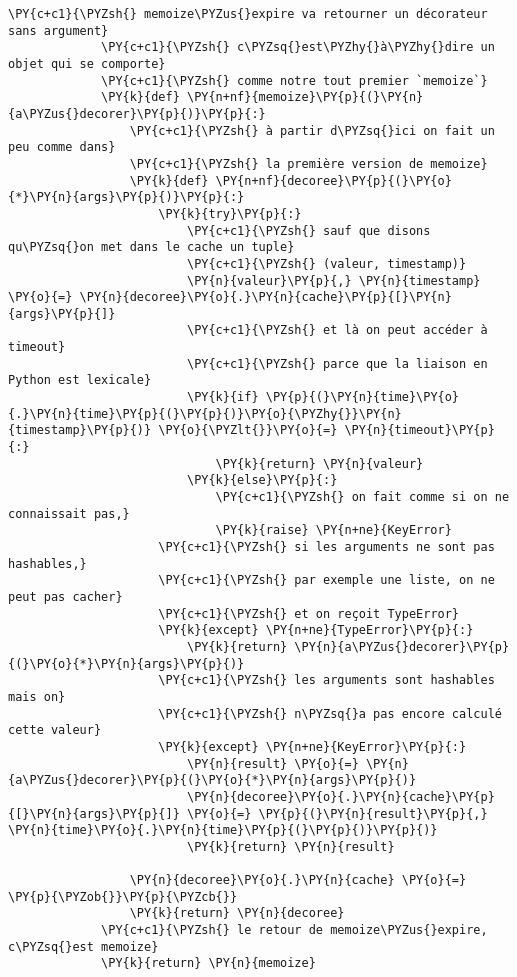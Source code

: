 \begin{Verbatim}[commandchars=\\\{\},frame=single,framerule=0.3mm,rulecolor=\color{cellframecolor}]
             \PY{c+c1}{\PYZsh{} memoize\PYZus{}expire va retourner un décorateur sans argument}
             \PY{c+c1}{\PYZsh{} c\PYZsq{}est\PYZhy{}à\PYZhy{}dire un objet qui se comporte}
             \PY{c+c1}{\PYZsh{} comme notre tout premier `memoize`}
             \PY{k}{def} \PY{n+nf}{memoize}\PY{p}{(}\PY{n}{a\PYZus{}decorer}\PY{p}{)}\PY{p}{:}
                 \PY{c+c1}{\PYZsh{} à partir d\PYZsq{}ici on fait un peu comme dans}
                 \PY{c+c1}{\PYZsh{} la première version de memoize}
                 \PY{k}{def} \PY{n+nf}{decoree}\PY{p}{(}\PY{o}{*}\PY{n}{args}\PY{p}{)}\PY{p}{:}
                     \PY{k}{try}\PY{p}{:}
                         \PY{c+c1}{\PYZsh{} sauf que disons qu\PYZsq{}on met dans le cache un tuple}
                         \PY{c+c1}{\PYZsh{} (valeur, timestamp)}
                         \PY{n}{valeur}\PY{p}{,} \PY{n}{timestamp} \PY{o}{=} \PY{n}{decoree}\PY{o}{.}\PY{n}{cache}\PY{p}{[}\PY{n}{args}\PY{p}{]}
                         \PY{c+c1}{\PYZsh{} et là on peut accéder à timeout}
                         \PY{c+c1}{\PYZsh{} parce que la liaison en Python est lexicale}
                         \PY{k}{if} \PY{p}{(}\PY{n}{time}\PY{o}{.}\PY{n}{time}\PY{p}{(}\PY{p}{)}\PY{o}{\PYZhy{}}\PY{n}{timestamp}\PY{p}{)} \PY{o}{\PYZlt{}}\PY{o}{=} \PY{n}{timeout}\PY{p}{:}
                             \PY{k}{return} \PY{n}{valeur}
                         \PY{k}{else}\PY{p}{:}
                             \PY{c+c1}{\PYZsh{} on fait comme si on ne connaissait pas,}
                             \PY{k}{raise} \PY{n+ne}{KeyError}
                     \PY{c+c1}{\PYZsh{} si les arguments ne sont pas hashables,}
                     \PY{c+c1}{\PYZsh{} par exemple une liste, on ne peut pas cacher}
                     \PY{c+c1}{\PYZsh{} et on reçoit TypeError}
                     \PY{k}{except} \PY{n+ne}{TypeError}\PY{p}{:}
                         \PY{k}{return} \PY{n}{a\PYZus{}decorer}\PY{p}{(}\PY{o}{*}\PY{n}{args}\PY{p}{)}
                     \PY{c+c1}{\PYZsh{} les arguments sont hashables mais on}
                     \PY{c+c1}{\PYZsh{} n\PYZsq{}a pas encore calculé cette valeur}
                     \PY{k}{except} \PY{n+ne}{KeyError}\PY{p}{:}
                         \PY{n}{result} \PY{o}{=} \PY{n}{a\PYZus{}decorer}\PY{p}{(}\PY{o}{*}\PY{n}{args}\PY{p}{)}
                         \PY{n}{decoree}\PY{o}{.}\PY{n}{cache}\PY{p}{[}\PY{n}{args}\PY{p}{]} \PY{o}{=} \PY{p}{(}\PY{n}{result}\PY{p}{,} \PY{n}{time}\PY{o}{.}\PY{n}{time}\PY{p}{(}\PY{p}{)}\PY{p}{)}
                         \PY{k}{return} \PY{n}{result}
         
                 \PY{n}{decoree}\PY{o}{.}\PY{n}{cache} \PY{o}{=} \PY{p}{\PYZob{}}\PY{p}{\PYZcb{}}
                 \PY{k}{return} \PY{n}{decoree}
             \PY{c+c1}{\PYZsh{} le retour de memoize\PYZus{}expire, c\PYZsq{}est memoize}
             \PY{k}{return} \PY{n}{memoize}
\end{Verbatim}


